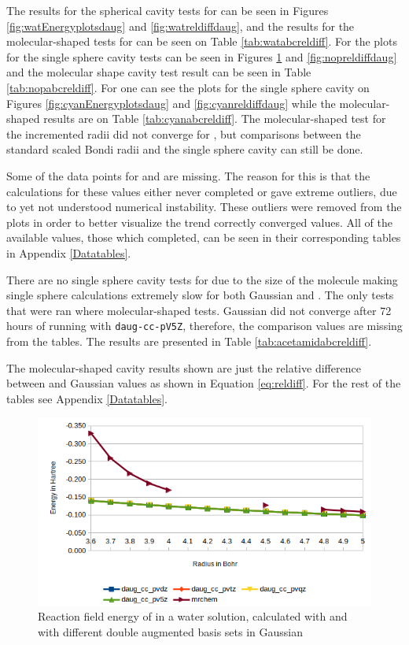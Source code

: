 \documentclass[../Thesis.tex]{subfiles}
\begin{document}
The results for the spherical cavity tests for  can be seen in Figures
\ref{fig:watEnergyplotsdaug} and \ref{fig:watreldiffdaug}, and the results for the
molecular-shaped tests for  can be seen on Table \ref{tab:watabcreldiff}.
For  the plots for the single sphere cavity tests can be seen in Figures
\ref{fig:nopEnergyplotsdaug} and \ref{fig:nopreldiffdaug} and the molecular
shape cavity test result can be seen in Table \ref{tab:nopabcreldiff}.
For  one can see the plots for the single sphere cavity on Figures
\ref{fig:cyanEnergyplotsdaug} and \ref{fig:cyanreldiffdaug} while the
molecular-shaped results are on Table \ref{tab:cyanabcreldiff}. The molecular-shaped
test for the incremented radii did not converge for , but comparisons between
the standard scaled Bondi radii and the single sphere cavity can still be done.

Some of the data points for  and  are missing. The reason for this
is that the calculations for these values either never completed or gave extreme
outliers, due to yet not understood numerical instability. These outliers were removed from the plots
in order to better visualize the trend correctly converged values.
All of the available values, those which completed, can be seen in their corresponding
tables in Appendix \ref{Datatables}.

There are no single sphere cavity tests for  due to the size of the molecule
making single sphere calculations extremely slow for both Gaussian and \mrchem.
The only tests that were ran where molecular-shaped tests. Gaussian did not converge
after 72 hours of running with \verb!daug-cc-pV5Z!, therefore, the comparison values
are missing from the tables. The  results are presented in Table
\ref{tab:acetamidabcreldiff}.

The molecular-shaped cavity results shown are just the relative difference between
\mrchem and Gaussian values as shown in Equation \ref{eq:reldiff}. For the rest of the
tables see Appendix \ref{Datatables}.

\begin{figure}[!htb]
  \centering
    \includegraphics[width=\linewidth]{img/Erdaugnop.png}
  \caption[Energy plots for ]{Reaction field energy of  in a water solution, calculated with \mrchem
  and with different double augmented basis sets in Gaussian}
  \label{fig:nopEnergyplotsdaug}
\end{figure}
\end{document}
